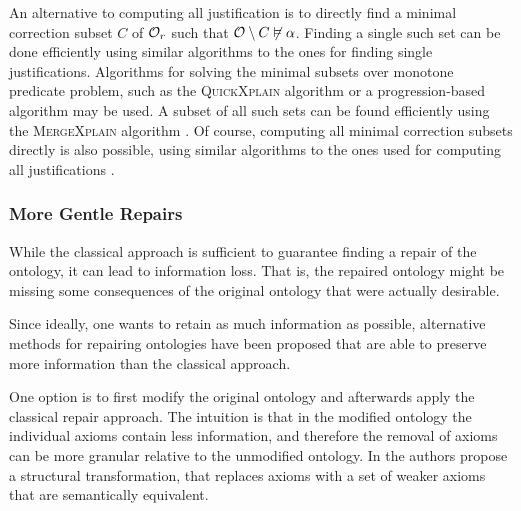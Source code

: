 An alternative to computing all justification is to directly find a minimal correction subset $C$ of $\mathcal{O}_r$ such that $\mathcal{O} \setminus C \not\vDash \alpha$. Finding a single such set can be done efficiently using similar algorithms to the ones for finding single justifications. Algorithms for solving the minimal subsets over monotone predicate problem, such as the \textsc{QuickXplain} algorithm \cite{junker2004preferred} or a progression-based algorithm \cite{marques2013minimal} may be used. A subset of all such sets can be found efficiently using the \textsc{MergeXplain} algorithm \cite{shchekotykhin2015mergexplain}. Of course, computing all minimal correction subsets directly is also possible, using similar algorithms to the ones used for computing all justifications \cite{malouf2007maximal}.

\subsubsection{More Gentle Repairs} \label{more-gentle-repairs}

While the classical approach is sufficient to guarantee finding a repair of the ontology, it can lead to information loss. That is, the repaired ontology might be missing some consequences of the original ontology that were actually desirable.

\begin{example}
\end{example}

Since ideally, one wants to retain as much information as possible, alternative methods for repairing ontologies have been proposed that are able to preserve more information than the classical approach.

One option is to first modify the original ontology and afterwards apply the classical repair approach. The intuition is that in the modified ontology the individual axioms contain less information, and therefore the removal of axioms can be more granular relative to the unmodified ontology. In \cite{horridge2008laconic} the authors propose a structural transformation, that replaces axioms with a set of weaker axioms that are semantically equivalent.

\begin{example}
\end{example}


